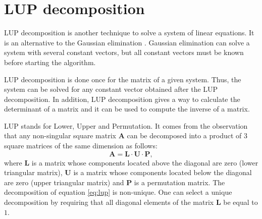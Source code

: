 \section{LUP decomposition}
\label{sec:lup} LUP decomposition is another technique to solve a
system of linear equations. It is an alternative to the Gaussian
elimination \cite{CorLeiRiv}. Gaussian elimination can solve a
system with several constant vectors, but all constant vectors
must be known before starting the algorithm.

LUP decomposition is done once for the matrix of a given system.
Thus, the system can be solved for any constant vector obtained
after the LUP decomposition. In addition, LUP decomposition gives
a way to calculate the determinant of a matrix and it can be used
to compute the inverse of a matrix.

LUP stands for Lower, Upper and Permutation. It comes from the
observation that any non-singular square matrix $\textbf{A}$ can be
decomposed into a product of 3 square matrices of the same
dimension as follows:
\begin{equation}
\label{eq:lup}
  \textbf{A}=\textbf{L}\cdot\textbf{U}\cdot\textbf{P},
\end{equation}
where ${\textbf{L}}$ is a matrix whose components located above the
diagonal are zero (lower triangular matrix), ${\textbf{U}}$ is a matrix
whose components located below the diagonal are zero (upper
triangular matrix) and ${\textbf{P}}$ is a permutation matrix. The
decomposition of equation \ref{eq:lup} is non-unique. One can
select a unique decomposition by requiring that all diagonal
elements of the matrix ${\textbf{L}}$ be equal to $1$.

